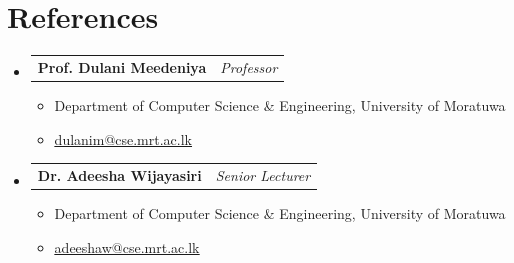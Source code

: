 \documentclass[a4paper,10pt]{article}
\makeatletter
\newcommand{\resumeItem}[1]{\item\small{#1}}
\newcommand{\resumeProjectHeading}[2]{
  \vspace{-1pt}\item
    \begin{tabular*}{0.97\textwidth}{l@{\extracolsep{\fill}}r}
      \textbf{#1} & \textit{\small #2} \\
    \end{tabular*}\vspace{-5pt}
}
\makeatother
\begin{document}
\section{References}
\begin{itemize}[leftmargin=0.15in, label={}]
    \resumeProjectHeading
      {Prof. Dulani Meedeniya}{Professor}
      \begin{itemize}[leftmargin=0.15in, label={\tiny$\bullet$}]
        \resumeItem{Department of Computer Science \& Engineering, University of Moratuwa}
        \resumeItem{\href{mailto:dulanim@cse.mrt.ac.lk}{\underline{dulanim@cse.mrt.ac.lk}}}
      \end{itemize}

    \resumeProjectHeading
      {Dr. Adeesha Wijayasiri}{Senior Lecturer}
      \begin{itemize}[leftmargin=0.15in, label={\tiny$\bullet$}]
        \resumeItem{Department of Computer Science \& Engineering, University of Moratuwa}
        \resumeItem{\href{mailto:adeeshaw@cse.mrt.ac.lk}{\underline{adeeshaw@cse.mrt.ac.lk}}}
      \end{itemize}
\end{itemize}
\end{document}
